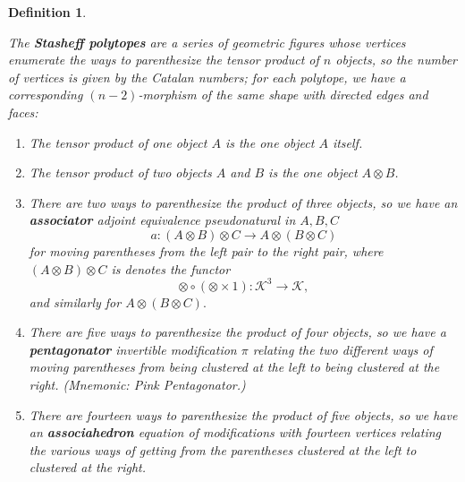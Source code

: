 \documentclass[12pt,twoside,openright]{report}
\newtheorem{defn}{Definition}
\newcommand{\maps}{\colon}
\newcommand{\tensor}{\otimes}
\newcommand{\C}{ {\mathcal{K}}  }
\begin{document}
\begin{defn}
\begin{itemize}
The {\bf Stasheff polytopes} \cite{Stasheff} are a series of geometric figures whose vertices enumerate the ways to parenthesize the tensor product of $n$ objects, so the number of vertices is given by the Catalan numbers; for each polytope, we have a corresponding $(n-2)$-morphism of the same shape with directed edges and faces:
  \begin{enumerate}
    \item The tensor product of one object $A$ is the one object $A$
itself.
    \item The tensor product of two objects $A$ and $B$ is the one object $A \tensor B$.
    \item There are two ways to parenthesize the product of three objects, so we have an {\bf associator} adjoint equivalence pseudonatural in $A,B,C$
        \[ a\maps (A\tensor B) \tensor C \rightarrow A \tensor (B
\tensor C) \]
      for moving parentheses from the left pair to the right pair, where
$(A \tensor B) \tensor C$ is denotes the functor 
      \[\tensor \circ (\tensor \times 1): \C^3 \to \C,\]
      and similarly for $A\tensor (B \tensor C).$
    \item There are five ways to parenthesize the product of four objects, so we have a {\bf pentagonator} invertible modification $\pi$
relating the two different ways of moving parentheses from being clustered at the left to being clustered at the right.  (Mnemonic: Pink Pentagonator.)
      \begin{center}
      \end{center}
    \item There are fourteen ways to parenthesize the product of five objects, so we have an {\bf associahedron} equation of modifications with fourteen vertices relating the various ways of getting from the parentheses clustered at the left to clustered at the right.

\end{enumerate}
\end{itemize}
\end{defn}
\end{document}
